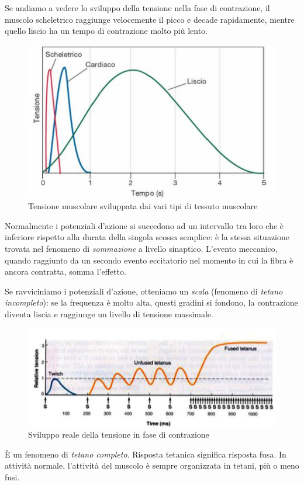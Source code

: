 \documentclass[a4paper,12pt]{article}
\begin{document}
Se andiamo a vedere lo sviluppo della tensione nella fase di contrazione, il muscolo scheletrico raggiunge velocemente il picco e decade rapidamente, mentre quello liscio ha un tempo di contrazione molto più lento.
\begin{figure}[H]
\centering
\includegraphics[scale=0.4]{immagine/tensione_muscolare.jpg}
\caption{Tensione muscolare sviluppata dai vari tipi di tessuto muscolare}
\end{figure}

Normalmente i potenziali d'azione si succedono ad un intervallo tra loro che è inferiore rispetto alla durata della singola scossa semplice: è la stessa situazione trovata nel fenomeno di \emph{sommazione} a livello sinaptico. L'evento meccanico, quando raggiunto da un secondo evento eccitatorio nel momento in cui la fibra è ancora contratta, somma l'effetto. 

Se ravviciniamo i potenziali d'azione, otteniamo un \emph{scala} (fenomeno di \emph{tetano incompleto}): se la frequenza è molto alta, questi gradini si fondono, la contrazione diventa liscia e raggiunge un livello di tensione massimale. 
\begin{figure}[H]
\centering
\includegraphics[scale=0.4]{immagine/scala.jpg}
\caption{Sviluppo reale della tensione in fase di contrazione}
\end{figure}
È un fenomeno di \emph{tetano completo}. Risposta tetanica significa risposta fusa. In attività normale, l'attività del muscolo è sempre organizzata in tetani, più o meno fusi. 
\end{document}
